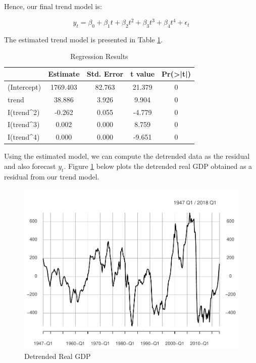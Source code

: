 \documentclass[]{book}
\theoremstyle{definition}
\theoremstyle{definition}
\theoremstyle{definition}
\theoremstyle{remark}
\begin{document}
Hence, our final trend model is:

\begin{equation}
y_t=\beta_0 +\beta_1 t + \beta_2 t^2 + \beta_3 t^3 + \beta_4 t^4 +\epsilon_t
\end{equation}

The estimated trend model is presented in Table \ref{tab:ch5-table2}.

\begin{table}[t]

\caption{\label{tab:ch5-table2}Regression Results}
\centering
\begin{tabular}{lcccc}
\toprule
  & Estimate & Std. Error & t value & Pr(>|t|)\\
\midrule
(Intercept) & 1769.403 & 82.763 & 21.379 & 0\\
trend & 38.886 & 3.926 & 9.904 & 0\\
I(trend\textasciicircum{}2) & -0.262 & 0.055 & -4.779 & 0\\
I(trend\textasciicircum{}3) & 0.002 & 0.000 & 8.759 & 0\\
I(trend\textasciicircum{}4) & 0.000 & 0.000 & -9.651 & 0\\
\bottomrule
\end{tabular}
\end{table}

Using the estimated model, we can compute the detrended data as the residual and also forecast \(y_t\). Figure \ref{fig:ch5-figure2} below plots the detrended real GDP obtained as a residual from our trend model.

\begin{figure}

{\centering \includegraphics[width=0.8\linewidth]{bookdown-demo_files/figure-latex/ch5-figure2-1} 

}

\caption{Detrended Real GDP}\label{fig:ch5-figure2}
\end{figure}
\end{document}
